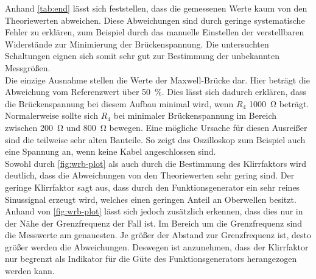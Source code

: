 \noindent Anhand \autoref{tab:end} lässt sich feststellen, dass die gemessenen Werte kaum von den Theoriewerten abweichen.
Diese Abweichungen sind durch geringe systematische Fehler zu erklären, zum Beispiel durch das manuelle Einstellen der verstellbaren Widerstände
zur Minimierung der Brückenspannung.
Die untersuchten Schaltungen eignen sich somit sehr gut zur Bestimmung der unbekannten Messgrößen.\\
Die einzige Ausnahme stellen die Werte der Maxwell-Brücke dar. Hier beträgt die Abweichung vom Referenzwert über \qty{50}{\percent}.
Dies lässt sich dadurch erklären, dass die Brückenspannung bei diesem Aufbau minimal wird, wenn $R_4$ \qty{1000}{\ohm} beträgt.
Normalerweise sollte sich $R_4$ bei minimaler Brückenspannung im Bereich zwischen \qty{200}{\ohm} und \qty{800}{\ohm} bewegen. Eine mögliche Ursache für diesen
Ausreißer sind die teilweise sehr alten Bauteile. So zeigt das Oszilloskop zum Beispiel auch eine Spannung an, wenn keine Kabel angeschlossen sind.\\

\noindent Sowohl durch \autoref{fig:wrb-plot} als auch durch die Bestimmung des Klirrfaktors wird deutlich, dass die Abweichungen von den Theoriewerten sehr gering sind.
Der geringe Klirrfaktor sagt aus, dass durch den Funktionsgenerator ein sehr reines Sinussignal erzeugt wird, welches einen geringen Anteil an Oberwellen besitzt. 
Anhand von \autoref{fig:wrb-plot} lässt sich jedoch zusätzlich erkennen, dass dies nur in der Nähe der Grenzfrequenz der Fall ist.
Im Bereich um die Grenzfrequenz sind die Messwerte am genauesten. Je größer der Abstand zur Grenzfrequenz ist, desto größer werden die Abweichungen.
Deswegen ist anzunehmen, dass der Klirrfaktor nur begrenzt als Indikator für die Güte des Funktionsgenerators herangezogen werden kann.